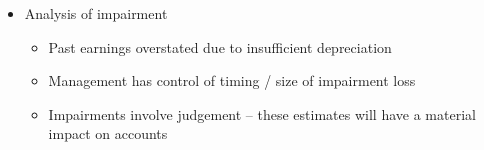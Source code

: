 \documentclass[../notes_compiled.tex]{subfiles}
\begin{document}
\begin{itemize}
\begin{multicols}{2}
\begin{itemize}
\item Income statement
\begin{itemize}
\item Decreases current net income (Impairment charge)
\item Increases future net income (Lower depreciation)
\end{itemize}

\item Cash flow
\begin{itemize}
\item Unaffected (Impairment is a non-cash charge)
\end{itemize}

\item Disclosure
\begin{itemize}
\item MD\&A, Footnotes
\end{itemize}

\item Fixed assets and turnover ratios
\begin{itemize}
\item Increase (Lower assets, therefore smaller denominator)
\end{itemize}

\item Debt-to-equity ratio
\begin{itemize}
\item Increase (Lower equity, as equity = A $-$ L)
\end{itemize}

\item Current-year ROA, ROE $\left(\frac{NI}{A}, \frac{NI}{E}\right)$
\begin{itemize}
\item Decrease (\% fall in NI $>$ \% fall in A, E)
\end{itemize}

\item Future ROA, ROE
\begin{itemize}
\item Increase (Lower A, E, higher NI since reduced depreciation)
\item[]
\item[]
\end{itemize}
\end{itemize}
\end{multicols}


\item Analysis of impairment
\begin{itemize}
\item Past earnings overstated due to insufficient depreciation
\item Management has control of timing / size of impairment loss
\item Impairments involve judgement -- these estimates will have a material impact on accounts
\end{itemize}


\end{itemize}
\end{document}
